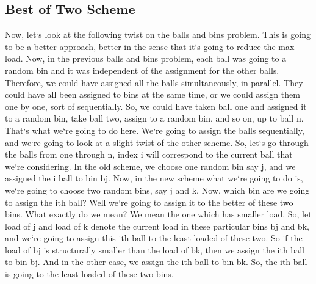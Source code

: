 \subsection{Best of Two Scheme}
Now, let`s look at the following twist on the balls and bins problem.
This is going to be a better approach, better in the sense that it`s going to reduce the max load.
Now, in the previous balls and bins problem, each ball was going to a random bin and it was independent of the assignment for the other balls.
Therefore, we could have assigned all the balls simultaneously, in parallel.
They could have all been assigned to bins at the same time, or we could assign them one by one, sort of sequentially.
So, we could have taken ball one and assigned it to a random bin, take ball two, assign to a random bin, and so on, up to ball n.
That`s what we`re going to do here.
We`re going to assign the balls sequentially, and we`re going to look at a slight twist of the other scheme.
So, let`s go through the balls from one through n, index i will correspond to the current ball that we`re considering.
In the old scheme, we choose one random bin say j, and we assigned the i ball to bin bj.
Now, in the new scheme what we`re going to do is, we`re going to choose two random bins, say j and k.
Now, which bin are we going to assign the ith ball? Well we`re going to assign it to the better of these two bins.
What exactly do we mean? We mean the one which has smaller load.
So, let load of j and load of k denote the current load in these particular bins bj and bk, and we`re going to assign this ith ball to the least loaded of these two.
So if the load of bj is structurally smaller than the load of bk, then we assign the ith ball to bin bj.
And in the other case, we assign the ith ball to bin bk.
So, the ith ball is going to the least loaded of these two bins.

